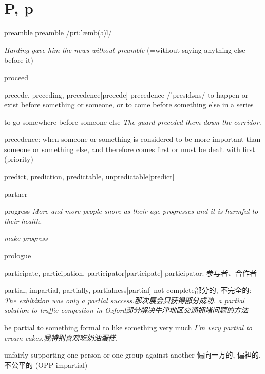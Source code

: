 \section{P, p}

\begin{DefWord}{preamble}
    preamble /priː'æmb(ə)l/

\textit{Harding gave him the news without preamble} (=without saying anything else before it)
\end{DefWord}

\begin{DefWord}{proceed}
\end{DefWord}

\begin{DefWord}{precede, preceding, precedence}[precede]
    precedence /ˈpresɪdəns/
    to happen or exist before something or someone, or to come before something else in a series

    to go somewhere before someone else
    \textit{The guard preceded them down the corridor.}

    precedence: when someone or something is considered to be more important than someone or something else, and therefore comes first or must be dealt with first (priority)
\end{DefWord}


\begin{DefWord}{predict, prediction, predictable, unpredictable}[predict]
\end{DefWord}

\begin{DefWord}{partner}
\end{DefWord}

\begin{DefWord}{progress}
    \textit{More and more people snore as their age progresses and it is harmful to their health.}

    \textit{make progress}
\end{DefWord}

\begin{DefWord}{prologue}
\end{DefWord}

\begin{DefWord}{participate, participation, participator}[participate]
    participator: 参与者、合作者
\end{DefWord}

\begin{DefWord}{partial, impartial, partially, partialness}[partial]
    not complete部分的, 不完全的:
    \textit{The exhibition was only a partial success.那次展会只获得部分成功. }
    \textit{a partial solution to traffic congestion in Oxford部分解决牛津地区交通拥堵问题的方法}

    be partial to something formal to like something very much
    \textit{I'm very partial to cream cakes.我特别喜欢吃奶油蛋糕. }

    unfairly supporting one person or one group against another 偏向一方的, 偏袒的, 不公平的 (OPP impartial)
\end{DefWord}

